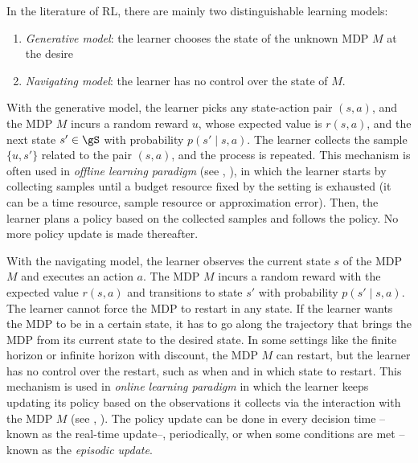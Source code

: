 
In the literature of RL, there are mainly two distinguishable learning models:
\begin{enumerate}[label=(\roman*)]
    \item \emph{Generative model}: the learner chooses the state of the unknown MDP $M$ at the desire
    \item \emph{Navigating model}: the learner has no control over the state of $M$.
\end{enumerate}
With the generative model, the learner picks any state-action pair $(s,a)$, and the MDP $M$ incurs a random reward $u$, whose expected value is $r(s,a)$, and the next state $s'\in\gS$ with probability $p(s'\mid s,a)$.
The learner collects the sample $\{u,s'\}$ related to the pair $(s,a)$, and the process is repeated.
This mechanism is often used in \emph{offline learning paradigm} (see  \eg, \cite{lange2012batch, levine2020offline}), in which the learner starts by collecting samples until a budget resource fixed by the setting is exhausted (it can be a time resource, sample resource or approximation error). Then, the learner plans a policy based on the collected samples and follows the policy.
No more policy update is made thereafter.

With the navigating model, the learner observes the current state $s$ of the MDP $M$ and executes an action $a$. The MDP $M$ incurs a random reward with the expected value $r(s,a)$ and transitions to state $s'$ with probability $p(s'\mid s,a)$.
The learner cannot force the MDP to restart in any state.
If the learner wants the MDP to be in a certain state, it has to go along the trajectory that brings the MDP from its current state to the desired state.
In some settings like the finite horizon or infinite horizon with discount, the MDP $M$ can restart, but the learner has no control over the restart, such as when and in which state to restart.
This mechanism is used in \emph{online learning paradigm} in which the learner keeps updating its policy based on the observations it collects via the interaction with the MDP $M$ (see \eg, \cite{jaksch2010near, osband2013more, azar2017minimax, ouyang2017learning,zanette2019tighter}).
The policy update can be done in every decision time --known as the real-time update--, periodically, or when some conditions are met --known as the \emph{episodic update}.


